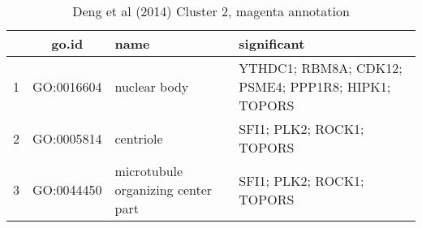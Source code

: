 \begin{table}[htp]
\begin{center}
\caption{Deng et al (2014) Cluster 2, magenta annotation} \label{tab:tab10}
\begin{tabular}{|c|c|p{1.5in}|p{4in}|}
  \hline
 & go.id & name  & significant \\ 
  \hline
1 & GO:0016604 & nuclear body  & \footnotesize{YTHDC1; RBM8A; CDK12; PSME4; PPP1R8; HIPK1; TOPORS} \\ 
  2 & GO:0005814 & centriole  & \footnotesize{SFI1; PLK2; ROCK1; TOPORS} \\ 
  3 & GO:0044450 & microtubule organizing center part  & \footnotesize{SFI1; PLK2; ROCK1; TOPORS} \\ 
   \hline
\end{tabular}
 \end{center} \label{tab:tab10}
  \end{table}


